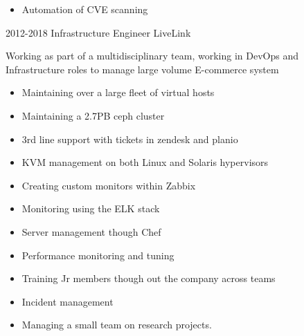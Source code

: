 \documentclass[]{friggeri-cv-a4}
\begin{document}
\begin{entrylist}
{\begin{itemize}
        \item Automation of CVE scanning
      \end{itemize}
    }
  \entry
  	{2012-2018}
  	{Infrastructure Engineer}
  	{LiveLink}
  	{
      Working as part of a multidisciplinary team, working in DevOps and Infrastructure roles to manage large volume E-commerce system
    \begin{itemize}
      \item Maintaining over a large fleet of virtual hosts
      \item Maintaining a 2.7PB ceph cluster
      \item 3rd line support with tickets in zendesk and planio
      \item KVM management on both Linux and Solaris hypervisors
      \item Creating custom monitors within Zabbix
      \item Monitoring using the ELK stack
      \item Server management though Chef
      \item Performance monitoring and tuning
      \item Training Jr members though out the company across teams
      \item Incident management
      \item Managing a small team on research projects.
    \end{itemize}
    }
 \end{entrylist}
\end{document}
